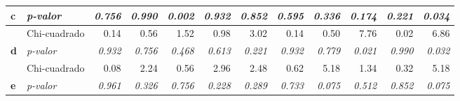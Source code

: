 \documentclass[mathematics,article,submit,moreauthors,pdftex]{mdpi}
\begin{document}
\begin{table}[H]
\begin{tabular}{llrrrrrrrrrr}
\multirow{-2}{*}{\textbf{c}}               & \textit{p-valor}                           & \textit{0.756}                        & \textit{0.990}                        & {\color[HTML]{C00000} \textit{0.002}} & \textit{0.932}                        & \textit{0.852}                        & \textit{0.595}                        & \textit{0.336}                        & \textit{0.174}                        & \textit{0.221}                        & {\color[HTML]{C00000} \textit{0.034}} \\ \hline
                                           & Chi-cuadrado                               & 0.14                                  & 0.56                                  & 1.52                                  & 0.98                                  & 3.02                                  & 0.14                                  & 0.50                                  & 7.76                                  & 0.02                                  & 6.86                                  \\ \cline{2-12} 
\multirow{-2}{*}{\textbf{d}}               & \textit{p-valor}                           & \textit{0.932}                        & \textit{0.756}                        & \textit{0.468}                        & \textit{0.613}                        & \textit{0.221}                        & \textit{0.932}                        & \textit{0.779}                        & {\color[HTML]{C00000} \textit{0.021}} & \textit{0.990}                        & {\color[HTML]{C00000} \textit{0.032}} \\ \hline
                                           & Chi-cuadrado                               & 0.08                                  & 2.24                                  & 0.56                                  & 2.96                                  & 2.48                                  & 0.62                                  & 5.18                                  & 1.34                                  & 0.32                                  & 5.18                                  \\ \cline{2-12} 
\multirow{-2}{*}{\textbf{e}}               & \textit{p-valor}                           & \textit{0.961}                        & \textit{0.326}                        & \textit{0.756}                        & \textit{0.228}                        & \textit{0.289}                        & \textit{0.733}                        & \textit{0.075}                        & \textit{0.512}                        & \textit{0.852}                        & \textit{0.075}                        \\ \hline

\end{tabular}
\end{table}
\end{document}
